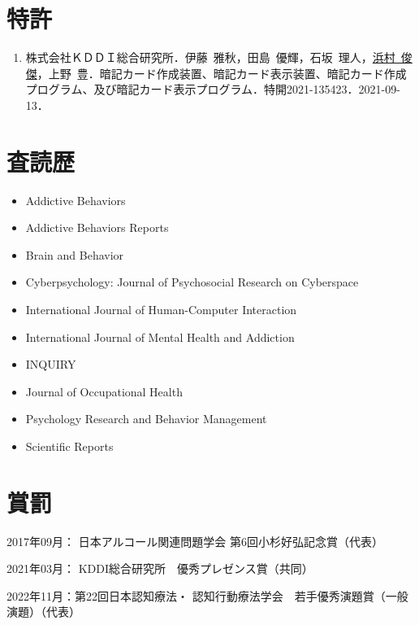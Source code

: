 \documentclass[11pt,a4paper]{article}
\begin{document}
\section{特許}
\begin{enumerate}
	\item 株式会社ＫＤＤＩ総合研究所．伊藤\ 雅秋，田島\ 優輝，石坂\ 理人，\underline{浜村\ 俊傑}，上野\ 豊．暗記カード作成装置、暗記カード表示装置、暗記カード作成プログラム、及び暗記カード表示プログラム．特開2021-135423．2021-09-13．
\end{enumerate}

\section{査読歴}
	\begin{itemize}
	\item Addictive Behaviors
	\item Addictive Behaviors Reports
	\item Brain and Behavior
	\item Cyberpsychology: Journal of Psychosocial Research on Cyberspace 
	\item International Journal of Human-Computer Interaction
	\item International Journal of Mental Health and Addiction
	\item INQUIRY
	\item Journal of Occupational Health
	\item Psychology Research and Behavior Management 
	\item Scientific Reports
\end{itemize}
\section{賞罰}
\begin{description}
	\item 2017年09月： 日本アルコール関連問題学会 第6回小杉好弘記念賞（代表）
	\item 2021年03月： KDDI総合研究所　優秀プレゼンス賞（共同）
	\item 2022年11月：第22回日本認知療法・	認知行動療法学会　若手優秀演題賞（一般演題）（代表）
\end{description}
\end{document}
